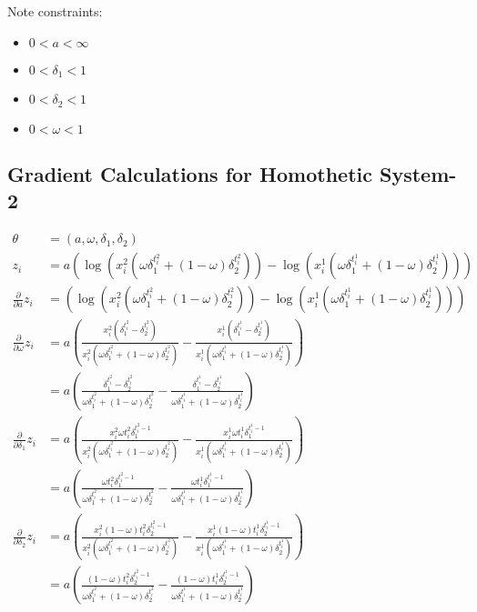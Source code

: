 \documentclass[12pt]{article}
\begin{document}
Note constraints:

\begin{itemize}
    \item{$0 < a < \infty$}
    \item{$0 < \delta_1 < 1$}
    \item{$0 < \delta_2 < 1$}
    \item{$0 < \omega < 1$}
\end{itemize}

\subsection{Gradient Calculations for Homothetic System-2}

\begin{align*}
  \theta &= (a, \omega, \delta_1, \delta_2) \\
  z_i &= a (
    \log(x^2_i (\omega \delta_1^{t^2_i} + (1 - \omega) \delta_2^{t^2_i}))
    - \log(x^1_i (\omega \delta_1^{t^1_i} + (1 - \omega) \delta_2^{t^1_i}))
  ) \\
  \frac{\partial}{\partial a} z_i
    &= (
      \log(x^2_i (\omega \delta_1^{t^2_i} + (1 - \omega) \delta_2^{t^2_i}))
      - \log(x^1_i (\omega \delta_1^{t^1_i} + (1 - \omega) \delta_2^{t^1_i}))
    ) \\
  \frac{\partial}{\partial \omega} z_i
    &= a (
      \frac{x^2_i (\delta_1^{t^2_i} - \delta_2^{t^2_i})}{x^2_i (\omega \delta_1^{t^2_i} + (1 - \omega) \delta_2^{t^2_i})}
      - \frac{x^1_i (\delta_1^{t^1_i} - \delta_2^{t^1_i})}{x^1_i (\omega \delta_1^{t^1_i} + (1 - \omega) \delta_2^{t^1_i})}
    ) \\
    &= a (
      \frac{\delta_1^{t^2_i} - \delta_2^{t^2_i}}{\omega \delta_1^{t^2_i} + (1 - \omega) \delta_2^{t^2_i}}
      - \frac{\delta_1^{t^1_i} - \delta_2^{t^1_i}}{\omega \delta_1^{t^1_i} + (1 - \omega) \delta_2^{t^1_i}}
    ) \\
  \frac{\partial}{\partial \delta_1} z_i
    &= a (
      \frac{x^2_i \omega t^2_i \delta_1^{t^2_i - 1}}{x^2_i (\omega \delta_1^{t^2_i} + (1 - \omega) \delta_2^{t^2_i})}
      - \frac{x^1_i \omega t^1_i \delta_1^{t^1_i - 1}}{x^1_i (\omega \delta_1^{t^1_i} + (1 - \omega) \delta_2^{t^1_i})}
    ) \\
    &= a (
      \frac{\omega t^2_i \delta_1^{t^2_i - 1}}{\omega \delta_1^{t^2_i} + (1 - \omega) \delta_2^{t^2_i}}
      - \frac{\omega t^1_i \delta_1^{t^1_i - 1}}{\omega \delta_1^{t^1_i} + (1 - \omega) \delta_2^{t^1_i}}
    ) \\
  \frac{\partial}{\partial \delta_2} z_i
    &= a (
      \frac{x^2_i (1 - \omega) t^2_i \delta_2^{t^2_i - 1}}{x^2_i (\omega \delta_1^{t^2_i} + (1 - \omega) \delta_2^{t^2_i})}
      - \frac{x^1_i (1 - \omega) t^1_i \delta_2^{t^1_i - 1}}{x^1_i (\omega \delta_1^{t^1_i} + (1 - \omega) \delta_2^{t^1_i})}
    ) \\
    &= a (
      \frac{(1 - \omega) t^2_i \delta_2^{t^2_i - 1}}{\omega \delta_1^{t^2_i} + (1 - \omega) \delta_2^{t^2_i}}
      - \frac{(1 - \omega) t^1_i \delta_2^{t^1_i - 1}}{\omega \delta_1^{t^1_i} + (1 - \omega) \delta_2^{t^1_i}}
    ) \\
\end{align*}
\end{document}
